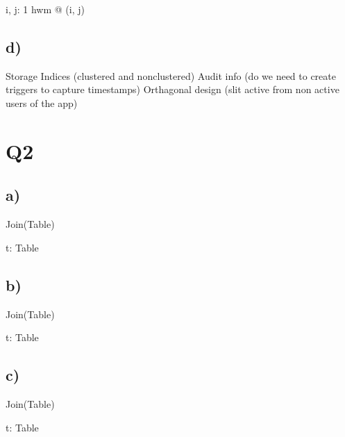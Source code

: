 \documentclass{article}
\begin{document}
\begin{zed}
\forall i, j: 1 \upto hwm @ (i, j)
\end{zed}

\subsection*{\small d)}

Storage
\newline
Indices (clustered and nonclustered)
\newline
Audit info (do we need to create triggers to capture timestamps)
\newline
Orthagonal design (slit active from non active users of the app)

\section*{Q2}

\subsection*{\small a)}

\begin{zed}
Join(Table)
\end{zed}

\begin{zed}
\forall t: Table
\end{zed}
    

\subsection*{\small b)}

\begin{zed}
Join(Table)
\end{zed}

\begin{zed}
\forall t: Table
\end{zed}

\subsection*{\small c)}

\begin{zed}
Join(Table)
\end{zed}

\begin{zed}
\forall t: Table
\end{zed}
\end{document}
